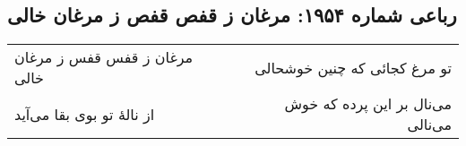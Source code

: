 \begin{center}
\section*{رباعی شماره ۱۹۵۴: مرغان ز قفص قفص ز مرغان خالی}
\label{sec:1954}
\begin{longtable}{l p{0.5cm} r}
مرغان ز قفس قفس ز مرغان خالی
&&
تو مرغ کجائی که چنین خوشحالی
\\
از نالهٔ تو بوی بقا می‌آید
&&
می‌نال بر این پرده که خوش می‌نالی
\\
\end{longtable}
\end{center}
